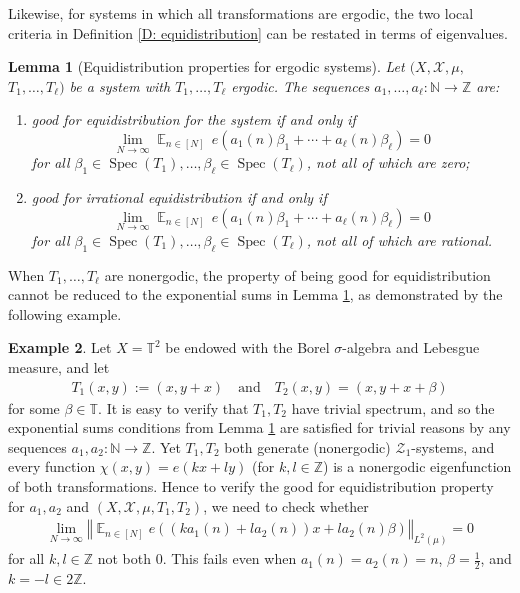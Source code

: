 \documentclass[11pt]{amsart}
\newtheorem{lemma}{Lemma}[section]
\theoremstyle{definition}
\newtheorem{example}[lemma]{Example}
\DeclareMathOperator*{\E}{\mathbb{E}}
\newcommand{\N}{{\mathbb N}}
\newcommand{\T}{{\mathbb T}}
\newcommand{\Z}{{\mathbb Z}}
\newcommand{\CX}{{\mathcal X}}
\newcommand{\CZ}{{\mathcal Z}}
\newcommand{\norm}[1]{\left\Vert #1\right\Vert}
\newcommand{\1}{{\mathbf{1}}}
\DeclareMathOperator{\Spec}{Spec}
\begin{document}
Likewise, for systems in which all transformations are ergodic, the two local criteria in Definition \ref{D: equidistribution} can be restated in terms of eigenvalues.
\begin{lemma}[Equidistribution properties for ergodic systems]\label{L: equidistribution condition for ergodic}
    Let $(X, \CX, \mu,$\! $T_1, \ldots, T_\ell)$ be a system with $T_1, \ldots, T_\ell$ ergodic. The sequences $a_1,\ldots,a_\ell\colon \N\to \Z$ are:
    \begin{enumerate}
        \item good for equidistribution for the system if and only if 
    $$
		\lim_{N\to\infty} \E_{n\in [N]}\, e(a_1(n)\beta_1+\cdots+a_\ell(n)\beta_\ell)=0
	$$
		for all  $\beta_1\in \Spec(T_1),\ldots, \beta_\ell\in \Spec(T_\ell)$, not all of which are zero;
        \item good for irrational equidistribution if and only if 
    $$
		\lim_{N\to\infty} \E_{n\in [N]}\, e(a_1(n)\beta_1+\cdots+a_\ell(n)\beta_\ell)=0
	$$
		for all  $\beta_1\in \Spec(T_1),\ldots, \beta_\ell\in \Spec(T_\ell)$, not all of which are rational.
    \end{enumerate}
\end{lemma}
When $T_1, \ldots, T_\ell$ are nonergodic, the property of being good for equidistribution cannot be reduced to the exponential sums in Lemma \ref{L: equidistribution condition for ergodic}, as demonstrated by the following example.
\begin{example}
    Let $X =\T^2$ be endowed with the Borel $\sigma$-algebra and Lebesgue measure, and let
    \begin{align*}
        T_1(x,y) := (x, y + x) \quad \textrm{and}\quad T_2(x,y) = (x, y + x + \beta)
    \end{align*}
    for some $\beta\in\T$.
    It is easy to verify that $T_1, T_2$ have trivial spectrum, and so the exponential sums conditions from Lemma \ref{L: equidistribution condition for ergodic} are satisfied for trivial reasons by any sequences $a_1,a_2:\N\to\Z$.
    Yet $T_1, T_2$ both generate (nonergodic) $\CZ_1$-systems, and every function $\chi(x,y) = e(kx + ly)$ (for $k,l\in\Z$) is a nonergodic eigenfunction of both transformations. Hence to verify the good for equidistribution property for $a_1, a_2$ and $(X, \CX, \mu, T_1,T_2)$, we need to check whether
    \begin{align*}
        \lim_{N\to\infty}\norm{\E_{n\in[N]}e((ka_1(n) + la_2(n))x + la_2(n)\beta)}_{L^2(\mu)} = 0
    \end{align*}
    for all $k,l\in\Z$ not both 0. This fails even when $a_1(n) = a_2(n) = n$, $\beta = \frac{1}{2}$, and $k = -l\in 2\Z$.
\end{example}
\end{document}

